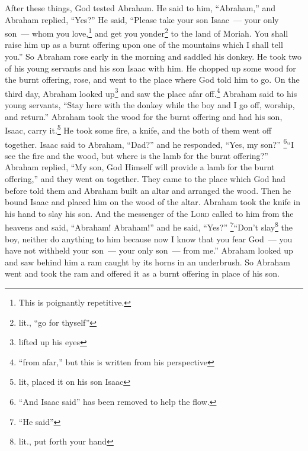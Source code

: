 
\begin{enumerate*}[mode=unboxed]
     After these things, God tested Abraham. He said to him, ``Abraham,'' and Abraham replied, ``Yes?''%
     He said, ``Please take your son Isaac~--- your only son~--- whom you love,\footnote{This is poignantly repetitive.} and get you yonder\footnote{lit., ``go for thyself''} to the land of Moriah. You shall raise him up as a burnt offering upon one of the mountains which I shall tell you.''%
     So Abraham rose early in the morning and saddled his donkey. He took two of his young servants and his son Isaac with him. He chopped up some wood for the burnt offering, rose, and went to the place where God told him to go.%
     On the third day, Abraham looked up\footnote{lifted up his eyes} and saw the place afar off.\footnote{``from afar,'' but this is written from his perspective}%
     Abraham said to his young servants, ``Stay here with the donkey while the boy and I go off, worship, and return.''%
     Abraham took the wood for the burnt offering and had his son, Isaac, carry it.\footnote{lit, placed it on his son Isaac} He took some fire, a knife, and the both of them went off together.%
     Isaac said to Abraham, ``Dad?'' and he responded, ``Yes, my son?'' \footnote{``And Isaac said'' has been removed to help the flow.}``I see the fire and the wood, but where is the lamb for the burnt offering?''%
     Abraham replied, ``My son, God Himself will provide a lamb for the burnt offering,'' and they went on together.%
     They came to the place which God had before told them and Abraham built an altar and arranged the wood. Then he bound Isaac and placed him on the wood of the altar.%
     Abraham took the knife in his hand to slay his son.%
     And the messenger of the \textsc{Lord} called to him from the heavens and said, ``Abraham! Abraham!'' and he said, ``Yes?''%
     \footnote{``He said''}``Don't slay\footnote{lit., put forth your hand} the boy, neither do anything to him because now I know that you fear God~--- you have not withheld your son~--- your only son~--- from me.''%
     Abraham looked up and saw behind him a ram caught by its horns in an underbrush. So Abraham went and took the ram and offered it as a burnt offering in place of his son.%

\end{enumerate*}
